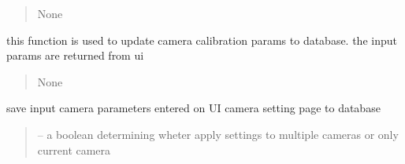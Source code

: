 \documentclass[letterpaper,10pt,english]{sphinxmanual}
\begin{document}
\begin{savenotes}
\begin{fulllineitems}
\begin{savenotes}
\begin{fulllineitems}
\begin{quote}
\begin{description}
\begin{itemize}
\end{itemize}

\sphinxAtStartPar
None

\end{description}\end{quote}

\end{fulllineitems}\end{savenotes}


\begin{savenotes}\begin{fulllineitems}
\label{\detokenize{setting/setting_api:oxin.setting_api.API.save_changed_calibration_params}}
\pysigstartsignatures
{}
\pysigstopsignatures
\sphinxAtStartPar
this function is used to update camera calibration params to database.
the input params are returned from ui
\begin{quote}\begin{description}
\sphinxAtStartPar
None

\end{description}\end{quote}

\end{fulllineitems}\end{savenotes}


\begin{savenotes}\begin{fulllineitems}
\label{\detokenize{setting/setting_api:oxin.setting_api.API.save_changed_camera_params}}
\pysigstartsignatures
{}
\pysigstopsignatures
\sphinxAtStartPar
save input camera parameters entered on UI camera setting page to database
\begin{quote}\begin{description}
\sphinxAtStartPar
{} – a boolean determining wheter apply settings to multiple cameras or only current camera


\end{description}
\end{quote}
\end{fulllineitems}
\end{savenotes}
\end{fulllineitems}
\end{savenotes}
\end{document}
